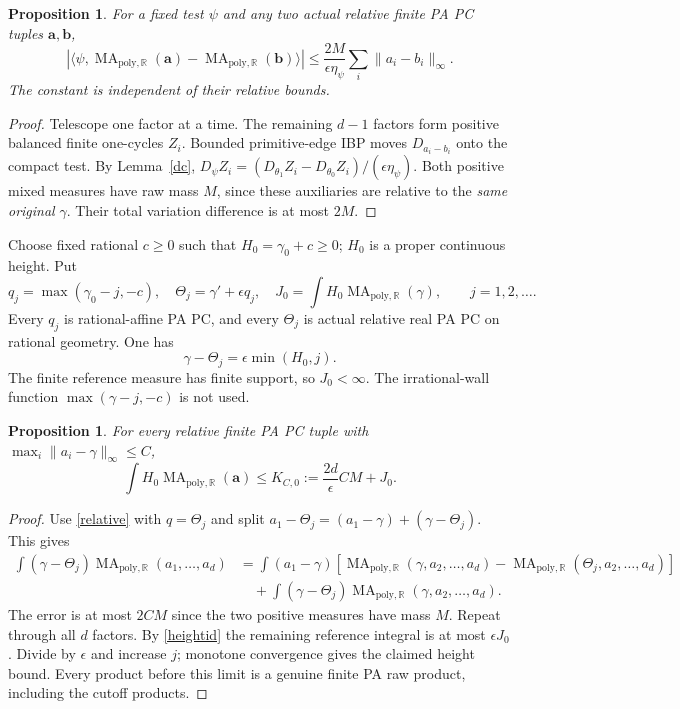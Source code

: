 \documentclass[11pt]{article}
\newtheorem{proposition}[theorem]{Proposition}
\newcommand{\R}{\mathbb R}
\newcommand{\MA}{\operatorname{MA}_{\mathrm{poly},\R}}
\begin{document}
\begin{proposition}\label{estimate}
For a fixed test $\psi$ and any two actual relative finite PA PC
tuples $\mathbf a,\mathbf b$,
\[
 |\langle\psi,\MA(\mathbf a)-\MA(\mathbf b)\rangle|
 \leq \frac{2M}{\epsilon\eta_\psi}
                       \sum_i\|a_i-b_i\|_\infty.
\]
The constant is independent of their relative bounds.
\end{proposition}
\begin{proof}
Telescope one factor at a time. The remaining $d-1$ factors form
positive balanced finite one-cycles $Z_i$. Bounded primitive-edge
IBP moves $D_{a_i-b_i}$ onto the compact test. By Lemma~\ref{dc},
$D_\psi Z_i=(D_{\theta_1}Z_i-D_{\theta_0}Z_i)/(\epsilon\eta_\psi)$.
Both positive mixed measures have raw mass $M$, since these
auxiliaries are relative to the \emph{same original} $\gamma$.
Their total variation difference is at most $2M$.
\end{proof}

Choose fixed rational $c\geq0$ such that $H_0=\gamma_0+c\geq0$;
$H_0$ is a proper continuous height. Put
\[
 q_j=\max(\gamma_0-j,-c),\quad
 \Theta_j=\gamma'+\epsilon q_j,\quad
 J_0=\int H_0\MA(\gamma),\qquad j=1,2,\ldots.
\]
Every $q_j$ is rational-affine PA PC, and every $\Theta_j$ is actual
relative real PA PC on rational geometry. One has
\begin{equation}\label{heightid}
 \gamma-\Theta_j=\epsilon\min(H_0,j).
\end{equation}
The finite reference measure has finite support, so $J_0<\infty$.
The irrational-wall function $\max(\gamma-j,-c)$ is not used.

\begin{proposition}\label{moment}
For every relative finite PA PC tuple with
$\max_i\|a_i-\gamma\|_\infty\leq C$,
\[
 \int H_0\MA(\mathbf a)\leq K_{C,0}
       :=\frac{2d}{\epsilon}CM+J_0.
\]
\end{proposition}
\begin{proof}
Use \eqref{relative} with $q=\Theta_j$ and split
$a_1-\Theta_j=(a_1-\gamma)+(\gamma-\Theta_j)$. This gives
\begin{align*}
 \int(\gamma-\Theta_j)\MA(a_1,\ldots,a_d)
 &=\int(a_1-\gamma)
       [\MA(\gamma,a_2,\ldots,a_d)-\MA(\Theta_j,a_2,\ldots,a_d)]\\
 &\quad+\int(\gamma-\Theta_j)\MA(\gamma,a_2,\ldots,a_d).
\end{align*}
The error is at most $2CM$ since the two positive measures have
mass $M$. Repeat through all $d$ factors. By \eqref{heightid} the
remaining reference integral is at most $\epsilon J_0$.
Divide by $\epsilon$ and increase $j$; monotone convergence gives
the claimed height bound. Every product before this limit is a
genuine finite PA raw product, including the cutoff products.
\end{proof}
\end{document}
